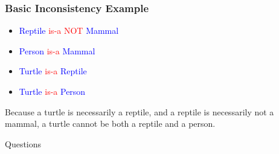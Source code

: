 \documentclass{beamer}
\begin{document}
\begin{frame}
\frametitle{Basic Inconsistency Example}

\begin{itemize}
\item \textcolor{blue}{Reptile} \textcolor{red}{is-a NOT} \textcolor{blue}{Mammal}
\item \textcolor{blue}{Person} \textcolor{red}{is-a} \textcolor{blue}{Mammal}
\item \textcolor{blue}{Turtle} \textcolor{red}{is-a} \textcolor{blue}{Reptile}
\item \textcolor{blue}{Turtle} \textcolor{red}{is-a} \textcolor{blue}{Person}
\end{itemize}

Because a turtle is necessarily a reptile, and a reptile is necessarily not a
mammal, a turtle cannot be both a reptile and a person. 
\end{frame}

\begin{frame}
\large{Questions}
\end{frame}
\end{document}
